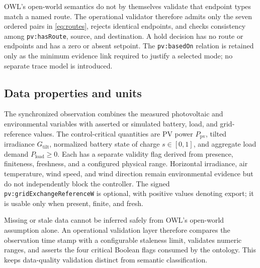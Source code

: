 \documentclass[
	letterpaper,
	10pt,
	unnumberedsections,
	twoside,
]{LTJournalArticle}
\newcommand{\pv}[1]{\texttt{pv:#1}}
\begin{document}
OWL's open-world semantics do not by themselves validate that endpoint types match a named route. The operational validator therefore admits only the seven ordered pairs in \autoref{eq:routes}, rejects identical endpoints, and checks consistency among \pv{hasRoute}, source, and destination. A hold decision has no route or endpoints and has a zero or absent setpoint. The \pv{basedOn} relation is retained only as the minimum evidence link required to justify a selected mode; no separate trace model is introduced.

\subsection{Data properties and units}

The synchronized observation combines the measured photovoltaic and environmental variables with asserted or simulated battery, load, and grid-reference values. The control-critical quantities are PV power $P_{\mathrm{pv}}$, tilted irradiance $G_{\mathrm{tilt}}$, normalized battery state of charge $s\in[0,1]$, and aggregate load demand $P_{\mathrm{load}}\geq0$. Each has a separate validity flag derived from presence, finiteness, freshness, and a configured physical range. Horizontal irradiance, air temperature, wind speed, and wind direction remain environmental evidence but do not independently block the controller. The signed \pv{gridExchangeReferenceW} is optional, with positive values denoting export; it is usable only when present, finite, and fresh.

Missing or stale data cannot be inferred safely from OWL's open-world assumption alone. An operational validation layer therefore compares the observation time stamp with a configurable staleness limit, validates numeric ranges, and asserts the four critical Boolean flags consumed by the ontology. This keeps data-quality validation distinct from semantic classification.
\end{document}
